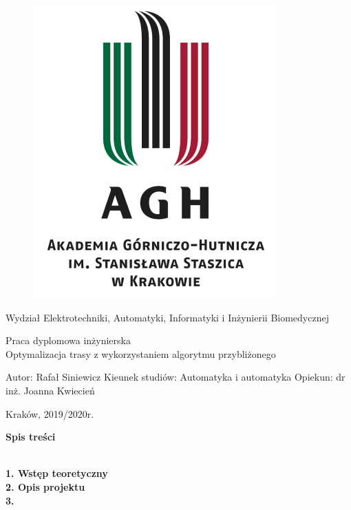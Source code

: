 \documentclass[a4paper, twoside, 12pt, justified]{article}
\begin{document}
	
	\begin{figure}[t]
		\includegraphics[scale=0.8]{AGH}
		\centering
	\end{figure}
	
	\begin{center}
		Wydział Elektrotechniki, Automatyki, Informatyki i Inżynierii Biomedycznej 
		\vspace{10mm} %
	
		Praca dyplomowa inżynierska \\ 
		\vspace{10mm}
		Optymalizacja trasy z wykorzystaniem algorytmu przybliżonego
	\end{center}
	
	\vfill
	\begin{flushleft}
		Autor: Rafał Siniewicz \newline
		Kieunek studiów: Automatyka i automatyka \newline 
		Opiekun: dr inż. Joanna Kwiecień \newline
	
	\end{flushleft}
	
	\begin{center}Kraków, 2019/2020r.\end{center}
	
	\newpage
	
	\begin{flushleft}
		\begin{large}\textbf{Spis treści}\end{large}
		\textbf{
			\\1. Wstęp teoretyczny\\
			2. Opis projektu\\
			3. 
		}
	\end{flushleft}
	\newpage
	
\end{document}

